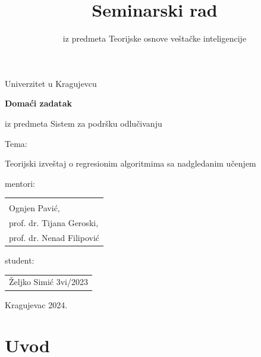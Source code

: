 \documentclass[fontsize=12bp, paper=a4]{scrarticle}
\title{Seminarski rad}
\subtitle{iz predmeta Teorijske osnove veštačke inteligencije}
\begin{document}
\begin{titlepage}
    
    \begin{center}
        
        \vspace*{8cm}
        
        \large{Univerzitet u Kragujevcu}
        
        \vspace*{1cm}

        {\bfseries \LARGE Domaći zadatak}
        
        \large{iz predmeta Sistem za podršku odlučivanju}
        
        \vspace*{1cm}
        \large{Tema:}

        \Large{Teorijski izveštaj o regresionim algoritmima sa nadgledanim učenjem}


        \vspace*{2cm}
    \end{center}
    \hfill{\parbox[s]{8cm}{

    mentori: 
    \begin{tabular}{l}
        \\
        \\
        Ognjen Pavić, \\
        prof. dr. Tijana Geroski, \\
        prof. dr. Nenad Filipović 
    \end{tabular}
    
    student: \begin{tabular}{l}
        Željko Simić 3vi/2023
    \end{tabular}
    }}

    \hspace*{\fill} 

    \vspace*{2cm}

    \begin{center}
        Kragujevac 2024.
    \end{center}
\end{titlepage}

\setcounter{page}{1}
\justifying
\linespread{1}
\cfoot[\pagemark]{\pagemark}
\ofoot[]{}
\chead[]{}
%

\section{Uvod}
\end{document}
